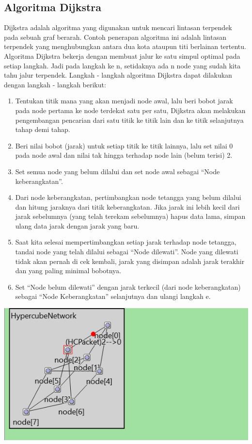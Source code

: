 \documentclass[conference]{IEEEtran}
\begin{document}
\subsection{Algoritma Dijkstra}
Dijkstra adalah algoritma yang digunakan untuk mencari lintasan terpendek pada sebuah graf berarah. Contoh penerapan algoritma ini adalah lintasan terpendek yang menghubungkan antara dua kota ataupun titi berlainan tertentu. Algoritma Dijkstra bekerja dengan membuat jalur ke satu simpul optimal pada setiap langkah. Jadi pada langkah ke n, setidaknya ada n node yang sudah kita tahu jalur terpendek. Langkah - langkah algoritma Dijkstra dapat dilakukan dengan langkah - langkah berikut:
\begin{enumerate}
	\item Tentukan titik mana yang akan menjadi node awal, lalu beri bobot jarak pada node pertama ke node terdekat satu per satu, Dijkstra akan melakukan pengembangan pencarian dari satu titik ke titik lain dan ke titik selanjutnya tahap demi tahap.
	\item Beri nilai bobot (jarak) untuk setiap titik ke titik lainnya, lalu set nilai 0 pada node awal dan nilai tak hingga terhadap node lain (belum terisi) 2.
	\item Set semua node yang belum dilalui  dan set node awal sebagai “Node keberangkatan”.
	\item Dari node keberangkatan, pertimbangkan node tetangga yang belum dilalui dan hitung jaraknya dari titik keberangkatan. Jika jarak ini lebih kecil dari jarak sebelumnya (yang telah terekam sebelumnya) hapus data lama, simpan ulang data jarak dengan jarak yang baru.
	\item Saat kita selesai mempertimbangkan setiap jarak terhadap node tetangga, tandai node yang telah dilalui sebagai “Node dilewati”. Node yang dilewati tidak akan pernah di cek kembali, jarak yang disimpan adalah jarak terakhir dan yang paling minimal bobotnya.
	\item Set “Node belum dilewati” dengan jarak terkecil (dari node keberangkatan) sebagai “Node Keberangkatan” selanjutnya dan ulangi langkah e.
\end{enumerate}
\break
\includegraphics[scale=0.5]{images/algoritma_di.PNG}
\end{document}
